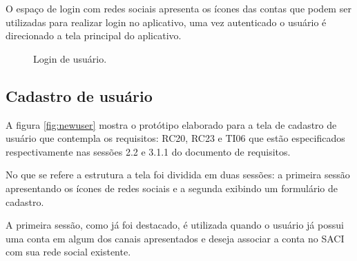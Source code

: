 \documentclass[12pt]{article}
\begin{document}
O espaço de login com redes sociais apresenta os ícones das contas que podem ser utilizadas para realizar login no aplicativo, uma vez autenticado o usuário é direcionado a tela principal do aplicativo.


\begin{figure}[h!]
  \caption{Login de usuário.}
  \label{fig:login}
\end{figure} 
\vfill%
\pagebreak%

\subsection{Cadastro de usuário}\label{subsec:Seccadastro}
A figura \ref{fig:newuser} mostra o protótipo elaborado para a tela de cadastro de usuário que contempla os requisitos: RC20, RC23 e TI06 que estão especificados respectivamente nas sessões 2.2 e 3.1.1 do documento de requisitos.

No que se refere a estrutura a tela foi dividida em duas sessões: a primeira sessão apresentando os ícones de redes sociais e a segunda exibindo um formulário de cadastro.

A primeira sessão, como já foi destacado, é utilizada quando o usuário já possui uma conta em algum dos canais apresentados e deseja associar a conta no SACI com sua rede social existente.
\end{document}
